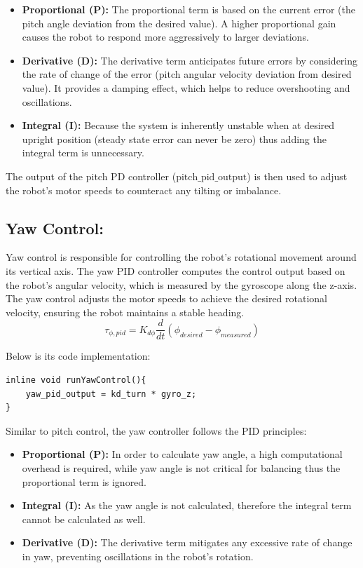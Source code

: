 \begin{itemize}
	\item \textbf{Proportional (P):} The proportional term is based on the current error (the pitch angle deviation from the desired value). A higher proportional gain causes the robot to respond more aggressively to larger deviations.
	\item \textbf{Derivative (D):} The derivative term anticipates future errors by considering the rate of change of the error (pitch angular velocity deviation from desired value). It provides a damping effect, which helps to reduce overshooting and oscillations.
	\item \textbf{Integral (I):} Because the system is inherently unstable when at desired upright position (steady state error can never be zero) thus adding the integral term is unnecessary. 
	
\end{itemize}

The output of the pitch PD controller ($\text{pitch\_pid\_output}$) is then used to adjust the robot's motor speeds to counteract any tilting or imbalance.

\subsection{Yaw Control:}
Yaw control is responsible for controlling the robot's rotational movement around its vertical axis. The yaw PID controller computes the control output based on the robot's angular velocity, which is measured by the gyroscope along the z-axis. The yaw control adjusts the motor speeds to achieve the desired rotational velocity, ensuring the robot maintains a stable heading.
\begin{equation}
	\tau_{\phi,pid} = K_{d\phi}\frac{d}{dt}(\phi_{desired} - \phi_{measured})
\end{equation}


Below is its code implementation:
\begin{lstlisting}[style=cppstyle]
inline void runYawControl(){
	yaw_pid_output = kd_turn * gyro_z;
}
\end{lstlisting}

Similar to pitch control, the yaw controller follows the PID principles:
\begin{itemize}
	\item \textbf{Proportional (P):} In order to calculate yaw angle, a high computational overhead is required, while yaw angle is not critical for balancing thus the proportional term is ignored.
	\item \textbf{Integral (I):} As the yaw angle is not calculated, therefore the integral term cannot be calculated as well.
	\item \textbf{Derivative (D):} The derivative term mitigates any excessive rate of change in yaw, preventing oscillations in the robot's rotation.
\end{itemize}


